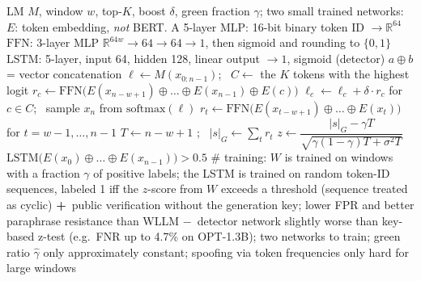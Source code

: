 \documentclass[10pt,a4paper,twocolumn]{article}
\newcommand{\pro}[1]{\Statex\textcolor{proc}{\textbf{+}\ #1}}
\newcommand{\con}[1]{\Statex\textcolor{conc}{\textbf{$-$}\ #1}}
\begin{document}
\begin{algorithm}[H]\small
\caption{UPV (Liu et al.\ 2024)}
\begin{algorithmic}[1]
\Require LM $M$, window $w$, top-$K$, boost $\delta$, green fraction $\gamma$; two small trained networks:
\Statex \quad $E$: token embedding, \emph{not} BERT. A 5-layer MLP: 16-bit binary token ID $\to\mathbb R^{64}$
\Statex \quad $\mathrm{FFN}$: 3-layer MLP $\mathbb R^{64w}\to64\to64\to1$, then sigmoid and rounding to $\{0,1\}$
\Statex \quad $\mathrm{LSTM}$: 5-layer, input 64, hidden 128, linear output $\to1$, sigmoid (detector)
\Statex \quad $a\oplus b$ = vector concatenation
 
 \State $\ell\gets M(x_{0:n-1})$; \ $C\gets$ the $K$ tokens with the highest logit
  \State $r_c\gets\mathrm{FFN}\big(E(x_{n-w+1})\oplus\dots\oplus E(x_{n-1})\oplus E(c)\big)$ 
 \EndFor
 \State $\ell_c\gets\ell_c+\delta\cdot r_c$ for $c\in C$; \ sample $x_n$ from $\mathrm{softmax}(\ell)$ 
\EndProcedure
{} 
 \State $r_t\gets\mathrm{FFN}\big(E(x_{t-w+1})\oplus\dots\oplus E(x_t)\big)$ for $t=w-1,\dots,n-1$
 \State $T\gets n-w+1$ ; \ $|s|_G\gets\sum_tr_t$
 \State $z\gets\dfrac{|s|_G-\gamma T}{\sqrt{\gamma(1-\gamma)T+\sigma^2T}}$ 
\EndProcedure
{} 
 \State \Return $\mathrm{LSTM}\big(E(x_0)\oplus\dots\oplus E(x_{n-1})\big)>0.5$ 
\EndProcedure
\Statex \# training: $W$ is trained on windows with a fraction $\gamma$ of positive labels; the LSTM is trained on random token-ID sequences, labeled 1 iff the $z$-score from $W$ exceeds a threshold (sequence treated as cyclic)
\pro{public verification without the generation key; lower FPR and better paraphrase resistance than WLLM}
\con{detector network slightly worse than key-based z-test (e.g.\ FNR up to 4.7\% on OPT-1.3B); two networks to train; green ratio $\hat\gamma$ only approximately constant; spoofing via token frequencies only hard for large windows}
\end{algorithmic}
\end{algorithm}
\end{document}
